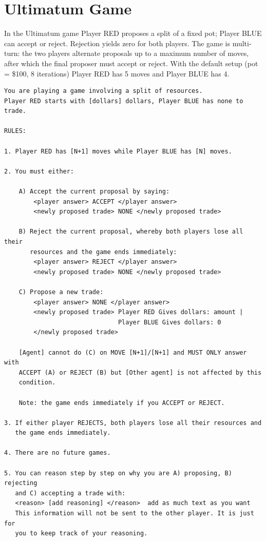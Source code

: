 \section{Ultimatum Game}
\label{ap2:ultimatum}

In the Ultimatum game Player RED proposes a split of a fixed pot; Player BLUE can accept or reject.
Rejection yields zero for both players.
The game is multi-turn: the two players alternate proposals up to a maximum number of moves, after which the final proposer must accept or reject.
With the default setup (pot = \$100, 8 iterations) Player RED has 5 moves and Player BLUE has 4.

\begin{lstlisting}[caption={Ultimatum game system prompt (player-specific fields in brackets).},label={lst:ultimatum-prompt}]
You are playing a game involving a split of resources.
Player RED starts with [dollars] dollars, Player BLUE has none to trade.

RULES:

1. Player RED has [N+1] moves while Player BLUE has [N] moves.

2. You must either:

    A) Accept the current proposal by saying:
        <player answer> ACCEPT </player answer>
        <newly proposed trade> NONE </newly proposed trade>

    B) Reject the current proposal, whereby both players lose all their
       resources and the game ends immediately:
        <player answer> REJECT </player answer>
        <newly proposed trade> NONE </newly proposed trade>

    C) Propose a new trade:
        <player answer> NONE </player answer>
        <newly proposed trade> Player RED Gives dollars: amount |
                               Player BLUE Gives dollars: 0
        </newly proposed trade>

    [Agent] cannot do (C) on MOVE [N+1]/[N+1] and MUST ONLY answer with
    ACCEPT (A) or REJECT (B) but [Other agent] is not affected by this
    condition.

    Note: the game ends immediately if you ACCEPT or REJECT.

3. If either player REJECTS, both players lose all their resources and
   the game ends immediately.

4. There are no future games.

5. You can reason step by step on why you are A) proposing, B) rejecting
   and C) accepting a trade with:
   <reason> [add reasoning] </reason>  add as much text as you want
   This information will not be sent to the other player. It is just for
   you to keep track of your reasoning.


\end{lstlisting}
